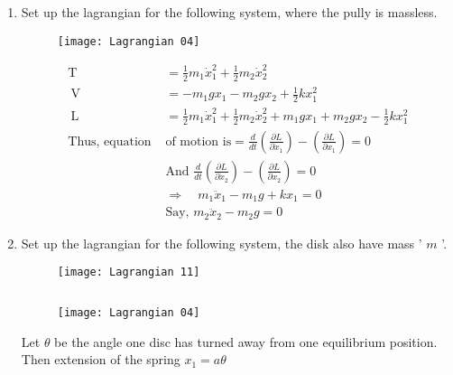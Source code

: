 \begin{enumerate}
\begin{answer}
\begin{align*}
\text{Or }\quad \frac{3}{4} m a^{2} \ddot{\theta}&+R a^{2} \theta+\frac{1}{2} m a\left(\ddot{x}_{2}-g\right)=0\\
\text{Or }\quad \ddot{\theta}&+\left(\frac{4}{3} \frac{k}{m}\right) \theta+\frac{2}{3 a}\left(\ddot{x}_{2}-g\right)=0
\intertext{Which are the required equation of motion.}
	\end{align*}
\end{answer}
\item Set up the lagrangian for the following system, where the pully is massless.
\begin{figure}[H]
	\centering
	\texttt{[image: Lagrangian 04]}
\end{figure}
\begin{answer}
	\begin{align*}
	\mathrm{T}&=\frac{1}{2} m_{1} \dot{x}_{1}^{2}+\frac{1}{2} m_{2} \dot{x}_{2}^{2}\\
	\mathrm{~V}&=-m_{1} g x_{1}-m_{2} g x_{2}+\frac{1}{2} k x_{1}^{2}\\
	\mathrm{~L}&=\frac{1}{2} m_{1} \dot{x}_{1}^{2}+\frac{1}{2} m_{2} \dot{x}_{2}^{2}+m_{1} g x_{1}+m_{2} g x_{2}-\frac{1}{2} k x_{1}^{2}\\
	\text{Thus, equation  }&\text{of motion is}=\frac{d}{d t}\left(\frac{\partial L}{\partial \dot{x}_{1}}\right)-\left(\frac{\partial L}{\partial x_{1}}\right)=0\\
	&\text{And }\frac{d}{d t}\left(\frac{\partial L}{\partial \dot{x}_{2}}\right)-\left(\frac{\partial L}{\partial x_{2}}\right)=0\\
	&\Rightarrow \quad m_{1} \ddot{x}_{1}-m_{1} g+k x_{1}=0\\
	&\text{Say, }m_{2} \ddot{x}_{2}-m_{2} g=0
	\end{align*}
\end{answer}
\item Set up the lagrangian for the following system, the disk also have mass ' $m$ '.
\begin{figure}[H]
	\centering
	\texttt{[image: Lagrangian 11]}
\end{figure}
\begin{answer}$\left. \right. $
	\begin{figure}[H]
		\centering
		\texttt{[image: Lagrangian 04]}
	\end{figure}
		Let $\theta$ be the angle one disc has turned away from one equilibrium position. Then extension of the spring $x_{1}=a \theta$\\

\end{answer}
\end{enumerate}
